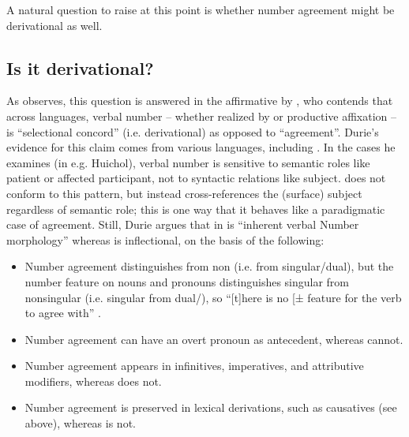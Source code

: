 \documentclass[output=paper,
modfonts
]{LSP/langsci}
\begin{document}
\begin{exe}
\begin{xlist}
A natural question to raise at this point is whether  number
agreement might be derivational as well.

\subsection{Is it derivational?}

As \citet[127--128]{anderson1992} observes, this question is answered in the
affirmative by \citet{durie1986}, who contends that across languages, verbal
number -- whether realized by   or productive
affixation -- is ``selectional concord'' (i.e. derivational) as opposed to
``agreement''. Durie's evidence for this claim comes from various
languages, including . In the  cases he examines (in
e.g. Huichol), verbal number is sensitive to semantic roles like patient
or affected participant, not to syntactic relations like subject.
  does not conform to this pattern, but instead
cross-references the (surface) subject regardless of semantic role; this
is one way that it behaves like a paradigmatic case of agreement. Still,
Durie argues that  in  is ``inherent verbal
Number morphology'' \citep[364]{durie1986} whereas  is
inflectional, on the basis of the following:

\begin{itemize}
\item Number agreement distinguishes  from non (i.e.  from
singular/dual), but the number feature on nouns and pronouns
distinguishes singular from nonsingular (i.e. singular from
dual/), so ``{[}t{]}here is no {[}±\isi{plural}{]} feature for the verb
to agree with'' \citep[364]{durie1986}.

\item Number agreement can have an overt pronoun as antecedent, whereas
 cannot.

\item Number agreement appears in infinitives, imperatives, and attributive
modifiers, whereas  does not.

\item Number agreement is preserved in lexical derivations, such as
causatives (see above), whereas  is not.
\end{itemize}


\end{xlist}
\end{exe}
\end{document}
